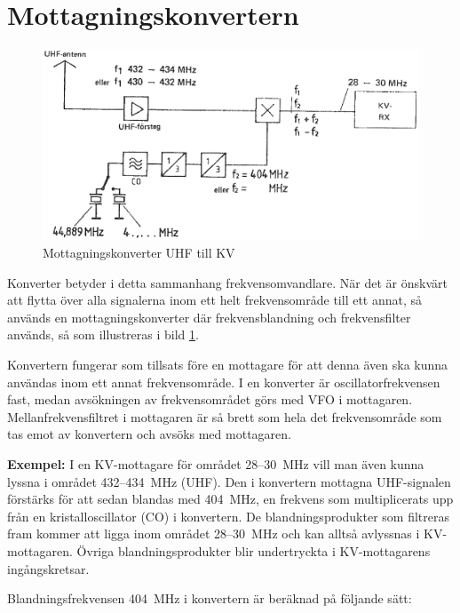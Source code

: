 \section{Mottagningskonvertern}

\begin{figure}
  \includegraphics[width=\textwidth]{images/cropped_pdfs/bild_2_4-18.pdf}
  \caption{Mottagningskonverter UHF till KV}
  \label{fig:bildII4-18}
\end{figure}

Konverter betyder i detta sammanhang frekvensomvandlare.
När det är önskvärt att flytta över alla signalerna inom ett helt frekvensområde
till ett annat, så används en mottagningskonverter där frekvensblandning och
frekvensfilter används, så som illustreras i bild \ref{fig:bildII4-18}.

Konvertern fungerar som tillsats före en mottagare för att denna även
ska kunna användas inom ett annat frekvensområde.
I en konverter är oscillatorfrekvensen fast, medan avsökningen av
frekvensområdet görs med VFO i mottagaren.
Mellanfrekvensfiltret i mottagaren är så brett som hela det frekvensområde
som tas emot av konvertern och avsöks med mottagaren.

\textbf{Exempel:}
I en KV-mottagare för området 28--30~MHz vill man även kunna lyssna i området
432--434~MHz (UHF).
Den i konvertern mottagna UHF-signalen förstärks för att sedan blandas med
404~MHz, en frekvens som multiplicerats upp från en kristalloscillator (CO) i
konvertern.
De blandningsprodukter som filtreras fram kommer att ligga inom området
28--30~MHz och kan alltså avlyssnas i KV-mottagaren.
Övriga blandningsprodukter blir undertryckta i KV-mottagarens ingångskretsar.

Blandningsfrekvensen 404~MHz i konvertern är beräknad på följande sätt:

